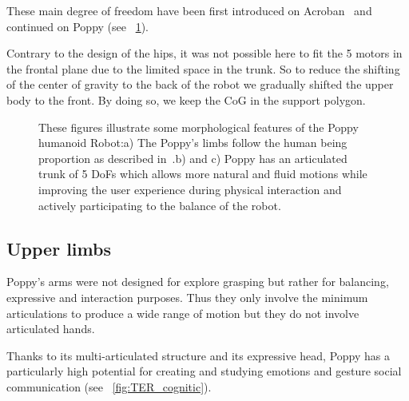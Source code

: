 These main degree of freedom have been first introduced on Acroban~\cite{Ly2011bio} and continued on Poppy (see \figurename~\ref{fig:poppy_torso}).

Contrary to the design of the hips, it was not possible here to fit the 5 motors in the frontal plane due to the limited space in the trunk. So to reduce the shifting of the center of gravity to the back of the robot we gradually shifted the upper body to the front. By doing so, we keep the CoG in the support polygon.



\begin{figure}[p]
\centering


    \hfil
    \caption{These figures illustrate some morphological features of the Poppy humanoid Robot:\newline a) The Poppy's limbs follow the human being proportion as described in~\cite{dufour2005biomecanique}.\newline b) and c) Poppy has an articulated trunk of 5 DoFs which allows more natural and fluid motions while improving the user experience during physical interaction and actively participating to the balance of the robot.}
    \label{fig:poppy_torso}
\end{figure}




\subsection{Upper limbs} %

Poppy's arms were not designed for explore grasping but rather for balancing, expressive and interaction purposes. Thus they only involve the minimum articulations to produce a wide range of motion but they do not involve articulated hands.


Thanks to its multi-articulated structure and its expressive head, Poppy has a particularly high potential for creating and studying emotions and gesture social communication (see \figurename~\ref{fig:TER_cognitic}).




